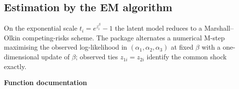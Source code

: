 \documentclass[11pt,a4paper]{article}
\begin{document}
\subsection{Estimation by the EM algorithm}
On the exponential scale $t_i=e^{z_i^{\beta}}-1$ the latent model
reduces to a Marshall--Olkin competing-risks scheme. The package
alternates a numerical M-step maximising the observed log-likelihood
in $(\alpha_1,\alpha_2,\alpha_3)$ at fixed $\beta$ with a
one-dimensional update of $\beta$; observed ties $z_{1i}=z_{2i}$
identify the common shock exactly.

\newpage
\begin{center}{\Large\bfseries Function documentation}\end{center}
\vspace{0.5em}
\end{document}
